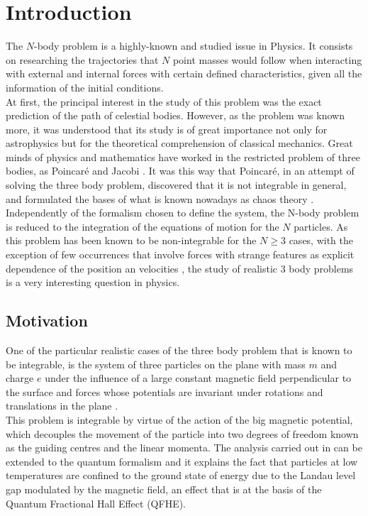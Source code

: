 \chapter{Introduction}
The $N$-body problem is a highly-known and studied issue in Physics. It consists on researching the trajectories that $N$ point masses would follow when interacting with external and internal forces with certain defined characteristics, given all the information of the initial conditions.\\

At first, the principal interest in the study of this problem was the exact prediction of the path of celestial bodies. However, as the problem was known more, it was understood that its study is of great importance not only for astrophysics but for the theoretical comprehension of classical mechanics. Great minds of physics and mathematics have worked in the restricted problem of three bodies, as Poincar\'e \cite{introPoincare} and Jacobi \cite{introJacobi}. It was this way that Poincar\'e, in an attempt of solving the three body problem, discovered that it is not integrable in general, and formulated the bases of what is known nowadays as chaos theory \cite{introPoincare}.\\

Independently of the formalism chosen to define the system, the N-body problem is reduced to the integration of the equations of motion for the $N$ particles. As this problem has been known to be non-integrable for the $N\geq 3$ cases, with the exception of few occurrences that involve forces with strange features as explicit dependence of the position an velocities \cite{strangeCases}, the study of realistic 3 body problems is a very interesting question in physics.\\

\section{Motivation}
One of the particular realistic cases of the three body problem that is known to be integrable, is the system of three particles on the plane with mass $m$ and charge $e$ under the influence of a large constant magnetic field perpendicular to the surface and forces whose potentials are invariant under rotations and translations in the plane \cite{alonso}.\\

This problem is integrable by virtue of the action of the big magnetic potential, which decouples the movement of  the particle into two degrees of freedom known as the guiding centres and the linear momenta. The analysis carried out in \cite{alonso} can be extended to the quantum formalism and it explains the fact that particles at low temperatures are confined to the ground state of energy due to the Landau level gap modulated by the magnetic field, an effect that is at the basis of the Quantum Fractional Hall Effect (QFHE).\\

